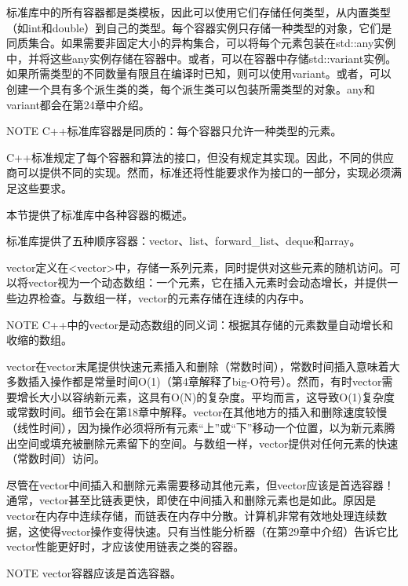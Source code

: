 标准库中的所有容器都是类模板，因此可以使用它们存储任何类型，从内置类型（如int和double）到自己的类型。每个容器实例只存储一种类型的对象，它们是同质集合。如果需要非固定大小的异构集合，可以将每个元素包装在std::any实例中，并将这些any实例存储在容器中。或者，可以在容器中存储std::variant实例。如果所需类型的不同数量有限且在编译时已知，则可以使用variant。或者，可以创建一个具有多个派生类的类，每个派生类可以包装所需类型的对象。any和variant都会在第24章中介绍。

\begin{myNotic}{NOTE}
C++标准库容器是同质的：每个容器只允许一种类型的元素。
\end{myNotic}

C++标准规定了每个容器和算法的接口，但没有规定其实现。因此，不同的供应商可以提供不同的实现。然而，标准还将性能要求作为接口的一部分，实现必须满足这些要求。

本节提供了标准库中各种容器的概述。


标准库提供了五种顺序容器：vector、list、forward\_list、deque和array。


vector定义在<vector>中，存储一系列元素，同时提供对这些元素的随机访问。可以将vector视为一个动态数组：一个元素，它在插入元素时会动态增长，并提供一些边界检查。与数组一样，vector的元素存储在连续的内存中。

\begin{myNotic}{NOTE}
C++中的vector是动态数组的同义词：根据其存储的元素数量自动增长和收缩的数组。
\end{myNotic}

vector在vector末尾提供快速元素插入和删除（常数时间），常数时间插入意味着大多数插入操作都是常量时间O(1)（第4章解释了big-O符号）。然而，有时vector需要增长大小以容纳新元素，这具有O(N)的复杂度。平均而言，这导致O(1)复杂度或常数时间。细节会在第18章中解释。vector在其他地方的插入和删除速度较慢（线性时间），因为操作必须将所有元素“上”或“下”移动一个位置，以为新元素腾出空间或填充被删除元素留下的空间。与数组一样，vector提供对任何元素的快速（常数时间）访问。

尽管在vector中间插入和删除元素需要移动其他元素，但vector应该是首选容器！通常，vector甚至比链表更快，即使在中间插入和删除元素也是如此。原因是vector在内存中连续存储，而链表在内存中分散。计算机非常有效地处理连续数据，这使得vector操作变得快速。只有当性能分析器（在第29章中介绍）告诉它比vector性能更好时，才应该使用链表之类的容器。

\begin{myNotic}{NOTE}
vector容器应该是首选容器。
\end{myNotic}

